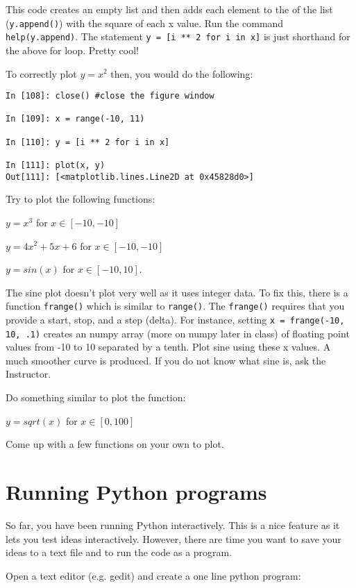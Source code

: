 \documentclass[12pt]{article}
\begin{document}
This code creates an empty list and then adds each element to the of the list (\texttt{y.append()}) with the square of each x value. Run the command \texttt{help(y.append)}. The statement \texttt{y = [i ** 2 for i in x]} is just shorthand for the above for loop. Pretty cool!

To correctly plot $y = x^2$ then, you would do the following:

\begin{lstlisting}[style=bash]
In [108]: close() #close the figure window

In [109]: x = range(-10, 11)

In [110]: y = [i ** 2 for i in x]

In [111]: plot(x, y)
Out[111]: [<matplotlib.lines.Line2D at 0x45828d0>]
\end{lstlisting}

Try to plot the following functions:

$y = x^3$ for $x \in [-10, -10]$

$y = 4x^2 + 5x + 6$ for $x \in [-10, -10]$

$y = sin(x)$ for $x \in [-10,10]$.

The sine plot doesn't plot very well as it uses integer data. To fix this, there is a function \texttt{frange()} which is similar to \texttt{range()}. The \texttt{frange()} requires that you provide a start, stop, and a step (delta). For instance, setting \texttt{x = frange(-10, 10, .1)} creates an numpy array (more on numpy later in class) of floating point values from -10 to 10 separated by a tenth. Plot sine using these x values. A much smoother curve is produced. If you do not know what sine is, ask the Instructor.

Do something similar to plot the function:

$y = sqrt(x)$ for $x \in [0, 100]$

Come up with a few functions on your own to plot.

\section{Running Python programs} 

So far, you have been running Python interactively. This is a nice feature as it lets you test ideas interactively. However, there are time you want to save your ideas to a text file and to run the code as a program.

Open a text editor (e.g. gedit) and create a one line python program:
\end{document}
